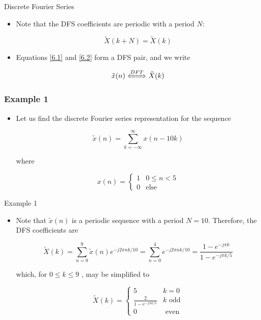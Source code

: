 \documentclass[pdflatex,compress,mathserif]{beamer}
\begin{document}
\begin{frame}{Discrete Fourier Series}
	
	\begin{itemize}
		\item 	Note that the DFS coefficients are periodic with a period $ N $:
		
		\begin{equation*}
			\tilde{X}(k+N) = \tilde{X}(k)
		\end{equation*}
		
		\item Equations \ref{6.1} and \ref{6.2} form a DFS pair, and we write
		
		\begin{equation*}
			\tilde{x}(n) \xLeftrightarrow{DFT} \tilde{X}(k)
		\end{equation*}
	\end{itemize}
\end{frame}

\begin{frame}
	\frametitle{Example 1}
	\begin{itemize}
		\item Let us find the discrete Fourier series representation for the sequence
		
		\begin{equation*}
			\tilde{x}(n) = \sum\limits_{k=-\infty}^{\infty} x(n-10k)
		\end{equation*}
		
		where
		
		\begin{equation*}
			x(n) =
			\begin{cases}
				1 & 0 \leq n < 5 \\
				0 & \text{else}
			\end{cases}
		\end{equation*}
	\end{itemize}
\end{frame}

\begin{frame}{Example 1}
	\begin{itemize}
		\item Note that $ \tilde{x}(n) $ is a periodic sequence with a period $ N = 10 $. Therefore, the DFS coefficients are
		
		\begin{equation*}
			\tilde{X}(k) = \sum\limits_{n = 0}^9 \tilde{x}(n) e^{-j2 \pi nk / 10} = \sum\limits_{n = 0}^4 e^{-j2 \pi nk / 10} = \frac{1 - e^{-j \pi k}}{1 - e^{-j \pi k/5}}
		\end{equation*}
		
		which, for $ 0 \leq k \leq 9 $ , may be simplified to
		
		\begin{equation*}
			\tilde{X}(k) = \begin{cases}
				5 & k = 0 \\
				\frac{2}{1 - e^{-j \pi k / 5}} & k \text{ odd} \\
				0 & \text{ even}
			\end{cases}
		\end{equation*}
	\end{itemize}
\end{frame}
\end{document}

